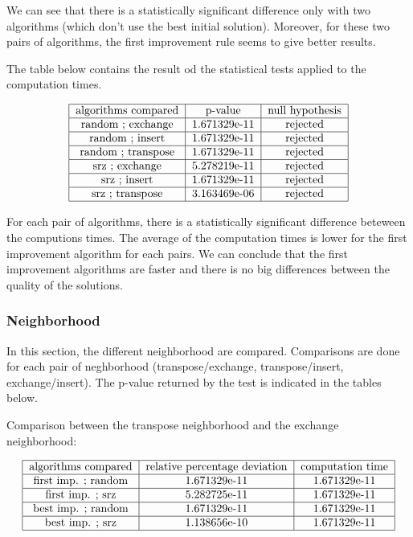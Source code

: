 \documentclass{article}
\begin{document}
We can see that there is a statistically significant difference only with two algorithms (which don't use the best initial solution).
Moreover, for these two pairs of algorithms, the first improvement rule seems to give better results. \newline

The table below contains the result od the statistical tests applied to the computation times.

\begin{align*}
\begin{tabular} {|c|c|c|} \hline
    algorithms compared & p-value & null hypothesis \\ \hline
    random ; exchange & 1.671329e-11 & rejected \\ \hline
    random ; insert & 1.671329e-11 & rejected \\ \hline
    random ; transpose & 1.671329e-11 & rejected \\ \hline
    srz ; exchange &5.278219e-11  & rejected \\ \hline
    srz ; insert & 1.671329e-11 & rejected \\ \hline
    srz ; transpose & 3.163469e-06 & rejected \\ \hline
\end{tabular}
\end{align*}

For each pair of algorithms, there is a statistically significant difference beteween the computions times.
The average of the computation times is lower for the first improvement algorithm for each pairs.
We can conclude that the first improvement algorithms are faster and there is no big differences between the quality of the solutions.

\subsubsection{Neighborhood}

In this section, the different neighborhood are compared. Comparisons are done for each pair of neghborhood (transpose/exchange, transpose/insert, exchange/insert). The p-value returned by the test is indicated in the tables below. \newline

Comparison between the transpose neighborhood and the exchange neighborhood:

\begin{align*}
\begin{tabular} {|c|c|c|c|c|} \hline
    algorithms compared & relative percentage deviation & computation time \\ \hline
    first imp. ; random & 1.671329e-11 & 1.671329e-11 \\ \hline
    first imp. ; srz & 5.282725e-11 & 1.671329e-11 \\ \hline
    best imp. ; random & 1.671329e-11 & 1.671329e-11 \\ \hline
    best imp. ; srz & 1.138656e-10 & 1.671329e-11 \\ \hline
\end{tabular}
\end{align*}
\end{document}
